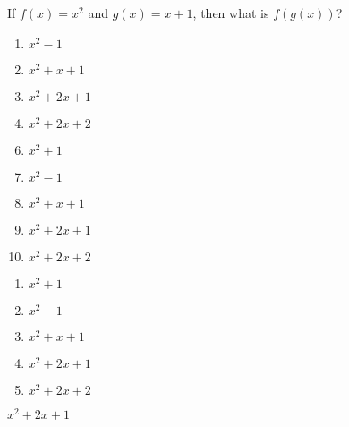 




 If $f(x)=x^{2}$ and $g(x)=x+1$, then what is $f(g(x))$?


\ifsat
	\begin{enumerate}[label=\Alph*)]
		\item  $x^{2}-1$
		\item  $x^{2}+x+1$
		\item  $x^{2}+2x+1$%
		\item   $x^{2}+2x+2$
	\end{enumerate}
\else
\fi

\ifacteven
	\begin{enumerate}[label=\textbf{\Alph*.},itemsep=\fill,align=left]
		\setcounter{enumii}{5}
		\item   $x^{2}+1$
		\item  $x^{2}-1$
		\item  $x^{2}+x+1$
		\addtocounter{enumii}{1}
		\item  $x^{2}+2x+1$%
		\item   $x^{2}+2x+2$
	\end{enumerate}
\else
\fi

\ifactodd
	\begin{enumerate}[label=\textbf{\Alph*.},itemsep=\fill,align=left]
		\item   $x^{2}+1$
		\item  $x^{2}-1$
		\item  $x^{2}+x+1$
		\item  $x^{2}+2x+1$%
		\item   $x^{2}+2x+2$
	\end{enumerate}
\else
\fi

\ifgridin
  $x^{2}+2x+1$%
		
\else
\fi

